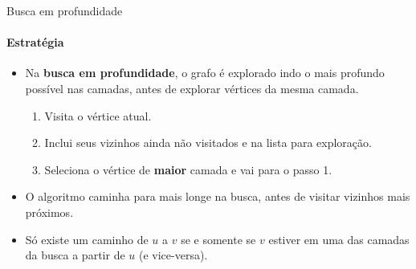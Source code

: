 \begin{frame}{Busca em profundidade}
	\framesubtitle{Estratégia}
	
	\begin{itemize}
		\item Na \textbf{\color{magenta}busca em profundidade}, o grafo é explorado indo o mais profundo possível nas camadas, antes de explorar vértices da mesma camada.
		
		\begin{enumerate}
			\item Visita o vértice atual.
			\item Inclui seus vizinhos ainda não visitados e na lista para exploração.
			\item Seleciona o vértice de \textbf{maior} camada e vai para o passo 1.
		\end{enumerate}
		
		\medskip
		\item O algoritmo caminha para mais longe na busca, antes de visitar vizinhos mais próximos.
		\item Só existe um caminho de $u$ a $v$ se e somente se $v$ estiver em uma das camadas da busca a partir de $u$ (e vice-versa).
	\end{itemize}
\end{frame}



